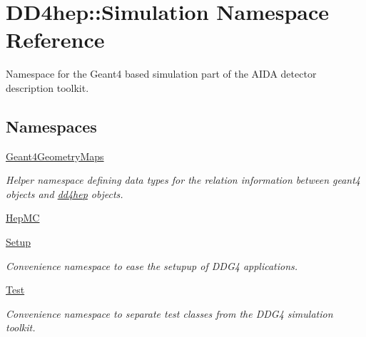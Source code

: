 \hypertarget{namespace_d_d4hep_1_1_simulation}{}\section{D\+D4hep\+:\+:Simulation Namespace Reference}
\label{namespace_d_d4hep_1_1_simulation}


Namespace for the Geant4 based simulation part of the A\+I\+DA detector description toolkit.  


\subsection*{Namespaces}
\begin{DoxyCompactItemize}
\item 
 \hyperlink{namespace_d_d4hep_1_1_simulation_1_1_geant4_geometry_maps}{Geant4\+Geometry\+Maps}
\begin{DoxyCompactList}\small\item\em Helper namespace defining data types for the relation information between geant4 objects and \hyperlink{namespacedd4hep}{dd4hep} objects. \end{DoxyCompactList}\item 
 \hyperlink{namespace_d_d4hep_1_1_simulation_1_1_hep_m_c}{Hep\+MC}
\item 
 \hyperlink{namespace_d_d4hep_1_1_simulation_1_1_setup}{Setup}
\begin{DoxyCompactList}\small\item\em Convenience namespace to ease the setupup of D\+D\+G4 applications. \end{DoxyCompactList}\item 
 \hyperlink{namespace_d_d4hep_1_1_simulation_1_1_test}{Test}
\begin{DoxyCompactList}\small\item\em Convenience namespace to separate test classes from the D\+D\+G4 simulation toolkit. \end{DoxyCompactList}\end{DoxyCompactItemize}
